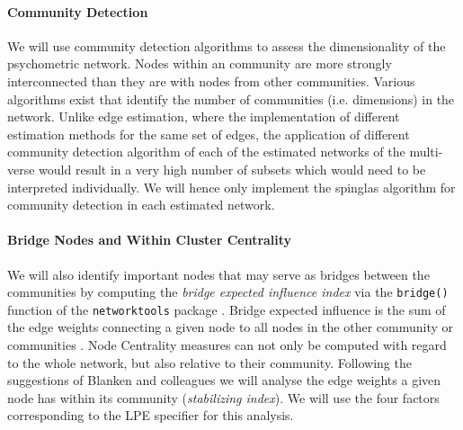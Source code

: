 \documentclass[a4paper,12pt]{article} %
\begin{document}
		\paragraph{Community Detection}
		We will use community detection algorithms to assess the dimensionality of the psychometric network.
		Nodes within an community are more strongly interconnected than they are with nodes from other communities.
		Various algorithms exist that identify the number of communities (i.e. dimensions) in the network.
		Unlike edge estimation, where the implementation of different estimation methods for the same set of edges, the application of different community detection algorithm of each of the estimated networks of the multi-verse would result in a very high number of subsets which would need to be interpreted individually. We will hence only implement the spinglas algorithm for community detection in each estimated network.


		\paragraph{Bridge Nodes and Within Cluster Centrality}
		We will  also identify important nodes that may serve as bridges between the communities by computing the \textit{bridge expected influence index} via the \texttt{bridge()} function of the \texttt{networktools} package \parencite{networktools}.
		Bridge expected influence is the sum of the edge weights connecting a given node to all nodes in the other community or communities \parencite{jones_bridge_2019}.
		Node Centrality measures can not only be computed with regard to the whole network, but also relative to their community.
		Following the suggestions of Blanken and colleagues \parencite*{blanken_role_2018} we will analyse the edge weights a given node has within its community (\textit{stabilizing index}). 
		We will use the four factors corresponding to the LPE specifier for this analysis.


%
\end{document}
